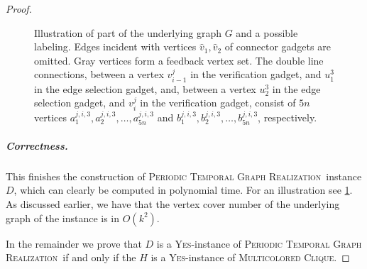 \documentclass[a4paper,UKenglish,cleveref, autoref, thm-restate, anonymous]{lipics-v2021}
\newcommand{\deltaExactLong}{\textsc{Periodic Temporal Graph Realization}}
\begin{document}
\begin{proof}
\begin{figure}%
\noindent{}
    \caption{Illustration of part of the underlying graph $G$ and a possible labeling. Edges incident with vertices $\hat{v}_1,\hat{v}_2$ of connector gadgets are omitted. Gray vertices form a feedback vertex set.
    The double line connections, between a vertex $v_{i-1}^j$ in the verification gadget, and $u_1^3$ in the edge selection gadget, 
    and, between a vertex $u_2^3$ in the edge selection gadget, and $v_{i}^j$ in the verification gadget,
    consist of $5n$ vertices $a_1^{j,i,3},a_2^{j,i,3},\dots,a_{5n}^{j,i,3}$ 
    and $b_1^{j,i,3},b_2^{j,i,3},\dots,b_{5n}^{j,i,3}$, respectively.
    }\label{fig:hardness1}
\end{figure}


\subparagraph{Correctness.} This finishes the construction of \deltaExactLong\ instance $D$, which can clearly be computed in polynomial time. For an illustration see \cref{fig:hardness1}. As discussed earlier, we have that the vertex cover number of the underlying graph of the instance is in $O(k^2)$.

In the remainder we prove that $D$ is a \textsc{Yes}-instance of \deltaExactLong\ if and only if the $H$ is a \textsc{Yes}-instance of \textsc{Multicolored Clique}.


\end{proof}
\end{document}
